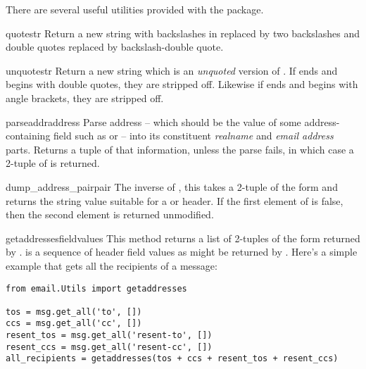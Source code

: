 
There are several useful utilities provided with the 
package.

\begin{funcdesc}{quote}{str}
Return a new string with backslashes in  replaced by two
backslashes and double quotes replaced by backslash-double quote.
\end{funcdesc}

\begin{funcdesc}{unquote}{str}
Return a new string which is an \emph{unquoted} version of .
If  ends and begins with double quotes, they are stripped
off.  Likewise if  ends and begins with angle brackets, they
are stripped off.
\end{funcdesc}

\begin{funcdesc}{parseaddr}{address}
Parse address -- which should be the value of some address-containing
field such as  or  -- into its constituent
\emph{realname} and \emph{email address} parts.  Returns a tuple of that
information, unless the parse fails, in which case a 2-tuple of
 is returned.
\end{funcdesc}

\begin{funcdesc}{dump_address_pair}{pair}
The inverse of , this takes a 2-tuple of the form
 and returns the string value suitable
for a  or  header.  If the first element of
 is false, then the second element is returned unmodified.
\end{funcdesc}

\begin{funcdesc}{getaddresses}{fieldvalues}
This method returns a list of 2-tuples of the form returned by
.   is a sequence of header field
values as might be returned by .  Here's a
simple example that gets all the recipients of a message:

\begin{verbatim}
from email.Utils import getaddresses

tos = msg.get_all('to', [])
ccs = msg.get_all('cc', [])
resent_tos = msg.get_all('resent-to', [])
resent_ccs = msg.get_all('resent-cc', [])
all_recipients = getaddresses(tos + ccs + resent_tos + resent_ccs)
\end{verbatim}
\end{funcdesc}

